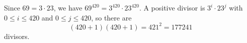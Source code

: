 Since $69=3\cdot23$, we have $69^{420}=3^{420}\cdot23^{420}$. A positive divisor is $3^i\cdot23^j$ with $0\le i\le420$ and $0\le j\le420$, so there are
\[(420+1)(420+1)=421^2=\boxed{177241}\]
divisors.
